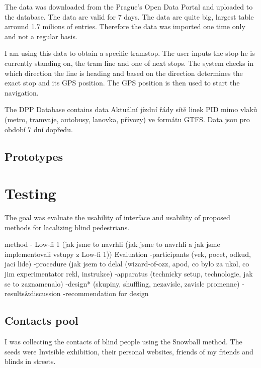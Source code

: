 \documentclass[11pt,oneside,a4paper]{book}
\begin{document}
	The data was downloaded from the Prague's Open Data Portal \cite{dpp-data} and uploaded to the database. The data are valid for 7 days.
	The data are quite big, largest table arround 1.7 milions of entries. Therefore the data was imported one time only and not a regular basis.
	
	I am using this data to obtain a specific tramstop. The user inputs the stop he is currently standing on, the tram line and one of next stops. The system checks in which direction the line is heading and based on the direction determines the exact stop and its GPS position. The GPS position is then used to start the navigation.
	
	The DPP Database contains data
	Aktuální jízdní řády sítě linek PID mimo vlaků (metro, tramvaje, autobusy, lanovka, přívozy) ve formátu GTFS. Data jsou pro období 7 dní dopředu.
	

	
	\section{Prototypes} \label{sec:prototypes}
	
	\chapter{Testing}	
		
	The goal was evaluate the usability of interface and usability of proposed methods for lacalizing blind pedestrians. 
	
	method - Low-fi 1
	(jak jsme to navrhli (jak jsme to navrhli a jak jsme implementovali vstupy z Low-fi 1))
	Evaluation
	-participants (vek, pocet, odkud, jaci lide)
	-procedure (jak jsem to delal (wizard-of-ozz, apod, co bylo za ukol, co jim experimentator rekl, instrukce)
	-apparatus (technicky setup, technologie, jak se to zaznamenalo)
	-design* (skupiny, shuffling, nezavisle, zavisle promenne)
	-results\&discussion
	-recommendation for design
	
	\section{Contacts pool} \label{sec:contactsPool}
	I was collecting the contacts of blind people using the Snowball method. The seeds were Invisible exhibition, their personal websites, friends of my friends and blinds in streets.
	
\end{document}
